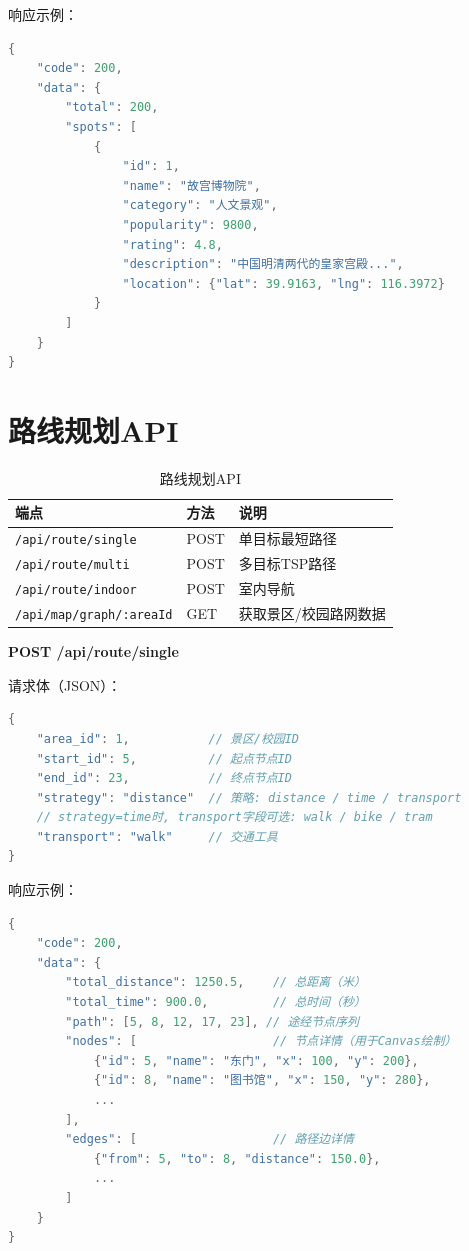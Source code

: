\documentclass[12pt,a4paper]{report}
\begin{document}
响应示例：
\begin{lstlisting}[language=C++]
{
    "code": 200,
    "data": {
        "total": 200,
        "spots": [
            {
                "id": 1,
                "name": "故宫博物院",
                "category": "人文景观",
                "popularity": 9800,
                "rating": 4.8,
                "description": "中国明清两代的皇家宫殿...",
                "location": {"lat": 39.9163, "lng": 116.3972}
            }
        ]
    }
}
\end{lstlisting}

\section{路线规划API}

\begin{table}[H]
\centering
\caption{路线规划API}
\small
\begin{tabularx}{\textwidth}{l l X}
\toprule
\textbf{端点} & \textbf{方法} & \textbf{说明} \\
\midrule
\texttt{/api/route/single} & POST & 单目标最短路径 \\
\texttt{/api/route/multi} & POST & 多目标TSP路径 \\
\texttt{/api/route/indoor} & POST & 室内导航 \\
\texttt{/api/map/graph/:areaId} & GET & 获取景区/校园路网数据 \\
\bottomrule
\end{tabularx}
\end{table}

\textbf{POST /api/route/single}

请求体（JSON）：
\begin{lstlisting}[language=C++]
{
    "area_id": 1,           // 景区/校园ID
    "start_id": 5,          // 起点节点ID
    "end_id": 23,           // 终点节点ID
    "strategy": "distance"  // 策略: distance / time / transport
    // strategy=time时, transport字段可选: walk / bike / tram
    "transport": "walk"     // 交通工具
}
\end{lstlisting}

响应示例：
\begin{lstlisting}[language=C++]
{
    "code": 200,
    "data": {
        "total_distance": 1250.5,    // 总距离（米）
        "total_time": 900.0,         // 总时间（秒）
        "path": [5, 8, 12, 17, 23], // 途经节点序列
        "nodes": [                   // 节点详情（用于Canvas绘制）
            {"id": 5, "name": "东门", "x": 100, "y": 200},
            {"id": 8, "name": "图书馆", "x": 150, "y": 280},
            ...
        ],
        "edges": [                   // 路径边详情
            {"from": 5, "to": 8, "distance": 150.0},
            ...
        ]
    }
}
\end{lstlisting}
\end{document}
